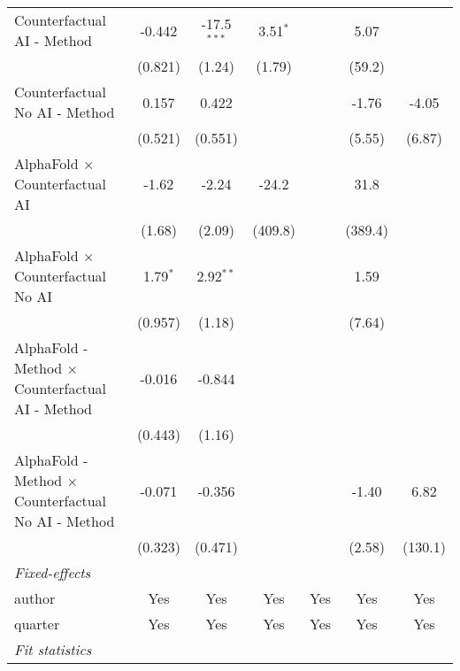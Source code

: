 \begin{tabular}{lcccccc}
   Counterfactual AI - Method                                 & -0.442     & -17.5$^{***}$ & 3.51$^{*}$  &        & 5.07       &   \\   
                                                              & (0.821)    & (1.24)        & (1.79)      &        & (59.2)     &   \\   
   Counterfactual No AI - Method                              & 0.157      & 0.422         &             &        & -1.76      & -4.05\\   
                                                              & (0.521)    & (0.551)       &             &        & (5.55)     & (6.87)\\   
   AlphaFold $\times$ Counterfactual AI                       & -1.62      & -2.24         & -24.2       &        & 31.8       &   \\   
                                                              & (1.68)     & (2.09)        & (409.8)     &        & (389.4)    &   \\   
   AlphaFold $\times$ Counterfactual No AI                    & 1.79$^{*}$ & 2.92$^{**}$   &             &        & 1.59       &   \\   
                                                              & (0.957)    & (1.18)        &             &        & (7.64)     &   \\   
   AlphaFold - Method $\times$ Counterfactual AI - Method     & -0.016     & -0.844        &             &        &            &   \\   
                                                              & (0.443)    & (1.16)        &             &        &            &   \\   
   AlphaFold - Method $\times$ Counterfactual No AI - Method  & -0.071     & -0.356        &             &        & -1.40      & 6.82\\   
                                                              & (0.323)    & (0.471)       &             &        & (2.58)     & (130.1)\\   
   \midrule
   \emph{Fixed-effects}\\
   author                                                     & Yes        & Yes           & Yes         & Yes    & Yes        & Yes\\  
   quarter                                                    & Yes        & Yes           & Yes         & Yes    & Yes        & Yes\\  
   \midrule
   \emph{Fit statistics}\\

\end{tabular}
